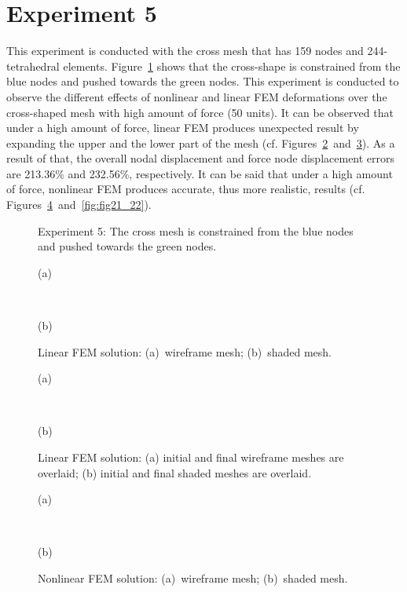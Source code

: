 \clearpage

\section{Experiment 5}
\label{v}

This experiment is conducted with the cross mesh that has 159 nodes and 244-tetrahedral elements. Figure~\ref{fig:fig14} shows that the cross-shape is constrained from the blue nodes and pushed towards the green nodes. This experiment is conducted to observe the different effects of nonlinear and linear FEM deformations over the cross-shaped mesh with high amount of force (50 units). It can be observed that under a high amount of force, linear FEM produces unexpected result by expanding the upper and the lower part of the mesh (cf. Figures~\ref{fig:fig15_16}~and~\ref{fig:fig17_18}). As a result of that, the overall nodal displacement and force node displacement errors are 213.36\% and 232.56\%, respectively. It can be said that under a high amount of force, nonlinear FEM produces accurate, thus more realistic, results (cf. Figures~\ref{fig:fig19_20}~and~\ref{fig:fig21_22}).

\begin{figure}[h]
\centerline{}
\caption{Experiment 5: The cross mesh is constrained from the blue nodes and pushed towards the green nodes.}
\label{fig:fig14}
\end{figure}

\begin{figure}[h]
\centerline{}
\centerline{(a)}
\centerline{\ }
\centerline{}
\centerline{(b)}
\caption{Linear FEM solution: (a)~wireframe mesh; (b)~shaded mesh.}
\label{fig:fig15_16}
\end{figure}

\begin{figure}[h]
\centerline{}
\centerline{(a)}
\centerline{\ }
\centerline{}
\centerline{(b)}
\caption{Linear FEM solution: (a) initial and final wireframe meshes are overlaid; (b) initial and final shaded meshes are overlaid.}
\label{fig:fig17_18}
\end{figure}

\begin{figure}[h]
\centerline{}
\centerline{(a)}
\centerline{\ }
\centerline{}
\centerline{(b)}
\caption{Nonlinear FEM solution: (a)~wireframe mesh; (b)~shaded mesh.}
\label{fig:fig19_20}
\end{figure}

